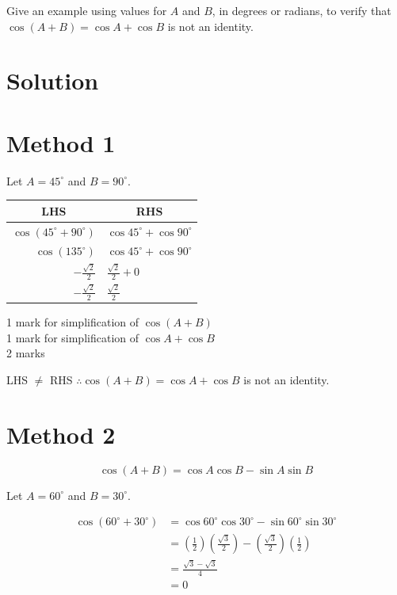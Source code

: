 \documentclass[10pt]{article}
\begin{document}
Give an example using values for $A$ and $B$, in degrees or radians, to verify that $\cos (A+B)=\cos A+\cos B$ is not an identity.

\section*{Solution}
\section*{Method 1}
Let $A=45^{\circ}$ and $B=90^{\circ}$.

\begin{center}
\begin{tabular}{r|l}
\multicolumn{1}{c|}{LHS} & \multicolumn{1}{|c}{RHS} \\
\hline
$\cos \left(45^{\circ}+90^{\circ}\right)$ & $\cos 45^{\circ}+\cos 90^{\circ}$ \\
$\cos \left(135^{\circ}\right)$ & $\cos 45^{\circ}+\cos 90^{\circ}$ \\
$-\frac{\sqrt{2}}{2}$ & $\frac{\sqrt{2}}{2}+0$ \\
$-\frac{\sqrt{2}}{2}$ & $\frac{\sqrt{2}}{2}$ \\
\end{tabular}
\end{center}

1 mark for simplification of $\cos (A+B)$\\
1 mark for simplification of $\cos A+\cos B$\\
2 marks

LHS $\neq$ RHS $\therefore \cos (A+B)=\cos A+\cos B$ is not an identity.

\section*{Method 2}
$$
\cos (A+B)=\cos A \cos B-\sin A \sin B
$$

Let $A=60^{\circ}$ and $B=30^{\circ}$.

$$
\begin{aligned}
\cos \left(60^{\circ}+30^{\circ}\right) & =\cos 60^{\circ} \cos 30^{\circ}-\sin 60^{\circ} \sin 30^{\circ} \\
& =\left(\frac{1}{2}\right)\left(\frac{\sqrt{3}}{2}\right)-\left(\frac{\sqrt{3}}{2}\right)\left(\frac{1}{2}\right) \\
& =\frac{\sqrt{3}-\sqrt{3}}{4} \\
& =0
\end{aligned}
$$
\end{document}
